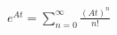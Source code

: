 \documentclass[preview]{standalone}
\begin{document}
\begin{align*}
e^{At} = \sum_{n=0}^{\infty} \frac{(At)^n}{n!}
\end{align*}
\end{document}
